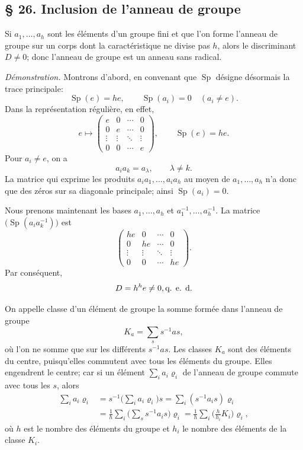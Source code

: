 
\subsection*{\S{} 26. Inclusion de l'anneau de groupe}
Si $a_1,\ldots,a_h$ sont les éléments d'un groupe fini et que l'on forme l'anneau de groupe sur un corps dont la caractéristique ne divise pas $h$, alors le discriminant $D\ne0$; donc l'anneau de groupe est un anneau sans radical.

\emph{Démonstration.} Montrons d'abord, en convenant que $\operatorname{Sp}$ désigne désormais la trace principale:
\[
        \operatorname{Sp}(e)=he,
        \qquad
        \operatorname{Sp}(a_i)=0\quad(a_i\ne e).
\]
Dans la représentation régulière, en effet,
\[
        e\mapsto\begin{pmatrix}e&0&\cdots&0\\0&e&\cdots&0\\\vdots&\vdots&\ddots&\vdots\\0&0&\cdots&e\end{pmatrix},
        \qquad \operatorname{Sp}(e)=he.
\]
Pour $a_i\ne e$, on a
\[
a_i a_k=a_\lambda,\qquad \lambda\ne k.
\]
La matrice qui exprime les produits $a_i a_1,\ldots,a_i a_h$ au moyen de $a_1,\ldots,a_h$ n'a donc que des zéros sur sa diagonale principale; ainsi $\operatorname{Sp}(a_i)=0$.

Nous prenons maintenant les bases $a_1,\ldots,a_h$ et
$a_1^{-1},\ldots,a_h^{-1}$. La matrice
$\bigl(\operatorname{Sp}(a_i a_k^{-1})\bigr)$ est
\[
\begin{pmatrix}
he&0&\cdots&0\\
0&he&\cdots&0\\
\vdots&\vdots&\ddots&\vdots\\
0&0&\cdots&he
\end{pmatrix}.
\]
Par conséquent,
\[
D=h^h e\ne0,\hfill\text{q. e. d.}
\]

On appelle classe d'un élément de groupe la somme formée dans l'anneau de groupe
\[
        K_a=\sum_s s^{-1}as,                         \tag{1}
\]
où l'on ne somme que sur les différents $s^{-1}as$. Les classes $K_a$ sont des éléments du centre, puisqu'elles commutent avec tous les éléments du groupe. Elles engendrent le centre; car si un élément
$\sum_i a_i\varrho_i$ de l'anneau de groupe commute avec tous les $s$, alors
\[
\begin{aligned}
\sum_i a_i\varrho_i
&=s^{-1}\biggl(\sum_i a_i\varrho_i\biggr)s
 =\sum_i(s^{-1}a_i s)\varrho_i\\
&=\frac1h\sum_i\biggl(\sum_s s^{-1}a_i s\biggr)\varrho_i
 =\frac1h\sum_i\biggl(\frac h{h_i}K_i\biggr)\varrho_i,
\end{aligned}
\]
où $h$ est le nombre des éléments du groupe et $h_i$ le nombre des éléments de la classe $K_i$.

